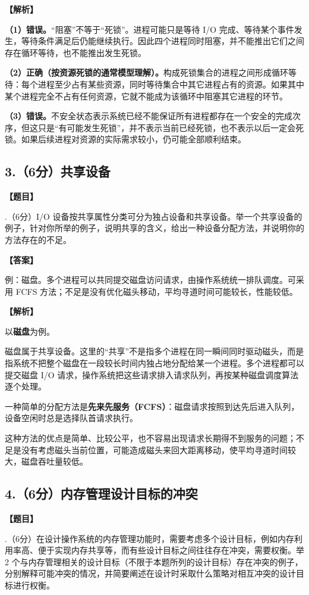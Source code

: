\documentclass[UTF8,12pt]{ctexart}
\newenvironment{question}{\par\medskip\noindent\textbf{【题目】}\par\smallskip}{\par\medskip}
\newenvironment{explanation}{\par\noindent\textbf{【解析】}\par\smallskip}{\par\medskip}
\newenvironment{answer}{\par\noindent\textbf{【答案】}\par\smallskip}{\par}
\begin{document}
\begin{explanation}
\textbf{（1）错误。}“阻塞”不等于“死锁”。进程可能只是等待 I/O 完成、等待某个事件发生，等待条件满足后仍能继续执行。因此四个进程同时阻塞，并不能推出它们之间存在循环等待，也不能推出发生死锁。

\textbf{（2）正确（按资源死锁的通常模型理解）。}构成死锁集合的进程之间形成循环等待：每个进程至少占有某些资源，同时等待集合中其它进程占有的资源。如果其中某个进程完全不占有任何资源，它就不能成为该循环中阻塞其它进程的环节。

\textbf{（3）错误。}不安全状态表示系统已经不能保证所有进程都存在一个安全的完成次序，但这只是“有可能发生死锁”，并不表示当前已经死锁，也不表示以后一定会死锁。如果后续进程对资源的实际需求较小，仍可能全部顺利结束。
\end{explanation}

\subsection*{3.（6分）共享设备}
\begin{question}
3.（6分）I/O 设备按共享属性分类可分为独占设备和共享设备。举一个共享设备的例子，针对你所举的例子，说明共享的含义，给出一种设备分配方法，并说明你的方法存在的不足。
\end{question}

\begin{answer}
例：磁盘。多个进程可以共同提交磁盘访问请求，由操作系统统一排队调度。可采用 FCFS 方法；不足是没有优化磁头移动，平均寻道时间可能较长，性能较低。
\end{answer}

\begin{explanation}
以\textbf{磁盘}为例。

磁盘属于共享设备。这里的“共享”不是指多个进程在同一瞬间同时驱动磁头，而是指系统不把整个磁盘在一段较长时间内独占地分配给某一个进程。多个进程都可以提交磁盘 I/O 请求，操作系统把这些请求排入请求队列，再按某种磁盘调度算法逐个处理。

一种简单的分配方法是\textbf{先来先服务（FCFS）}：磁盘请求按照到达先后进入队列，设备空闲时总是选择队首请求执行。

这种方法的优点是简单、比较公平，也不容易出现请求长期得不到服务的问题；不足是没有考虑磁头当前位置，可能造成磁头来回大距离移动，使平均寻道时间较大，磁盘吞吐量较低。
\end{explanation}

\subsection*{4.（6分）内存管理设计目标的冲突}
\begin{question}
4.（6分）在设计操作系统的内存管理功能时，需要考虑多个设计目标，例如内存利用率高、便于实现内存共享等，而有些设计目标之间往往存在冲突，需要权衡。举 2 个与内存管理相关的设计目标（不限于本题所列的设计目标）存在冲突的例子，分别解释可能冲突的情况，并简要阐述在设计时采取什么策略对相互冲突的设计目标进行权衡。
\end{question}
\end{document}
